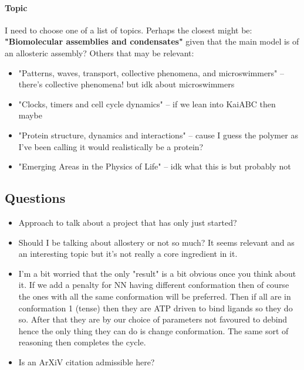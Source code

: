 \documentclass[11pt]{article}
\begin{document}
\paragraph{Topic}
I need to choose one of a list of topics.
Perhaps the closest might be: \textbf{"Biomolecular assemblies and condensates"} given that the main model is of an allosteric assembly?
Others that may be relevant:
\begin{itemize}
	\item "Patterns, waves, transport, collective phenomena, and microswimmers" -- there's collective phenomena! but idk about microswimmers
	\item "Clocks, timers and cell cycle dynamics" -- if we lean into KaiABC then maybe
	\item "Protein structure, dynamics and interactions" -- cause I guess the polymer as I've been calling it would realistically be a protein?
	\item "Emerging Areas in the Physics of Life" -- idk what this is but probably not
\end{itemize}

\subsection{Questions}
\begin{itemize}
	\item Approach to talk about a project that has only just started?
	\item Should I be talking about allostery or not so much? It seems relevant and as an interesting topic but it's not really a core ingredient in it.
    \item I'm a bit worried that the only "result" is a bit obvious once you think about it. If we add a penalty for NN having different conformation then of course the ones with all the same conformation will be preferred. Then if all are in conformation 1 (tense) then they are ATP driven to bind ligands so they do so. After that they are by our choice of parameters not favoured to debind hence the only thing they can do is change conformation. The same sort of reasoning then completes the cycle.
    \item Is an ArXiV citation admissible here?\cite{soneHermitianNonHermitianTopology2024}
\end{itemize}
\end{document}
